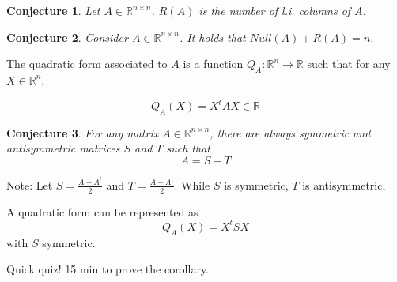 \documentclass[aspectratio=169]{beamer}
\newtheorem{proposition}{Conjecture}[section]
\begin{document}
\begin{frame}
    \begin{proposition}
        Let $A\in\mathds{R}^{n\times n}$. $R(A)$ is the number of l.i. columns of $A$.
    \end{proposition}
    
    \begin{proposition}
        Consider $A\in\mathds{R}^{n\times n}$. It holds that $Null(A)+R(A)=n$.
    \end{proposition}
\end{frame}
\iffalse
\begin{frame}
    \begin{proposition}
        For any $A\in\mathds{R}^{n\times n}$, there is an invertible matrix $C$, and an upper triangular matrix $R$ such that, $$CA=R\Leftrightarrow A=C^{-1}R$$
    \end{proposition}
\end{frame}
\fi
\begin{frame}
    \begin{definition}
        The quadratic form associated to $A$ is a function $Q_A:\mathds{R}^n\rightarrow\mathds{R}$ such that for any $X\in\mathds{R}^n$,
        
        $$Q_A(X)=X^tAX\in\mathds{R}$$
    \end{definition}
\end{frame}

\begin{frame}

\begin{proposition}
    For any matrix $A\in\mathds{R}^{n\times n}$, there are always symmetric and antisymmetric matrices $S$ and $T$ such that $$A=S+T$$
\end{proposition}

Note:  Let $S=\frac{A+A^t}{2}$ and $T=\frac{A-A^t}{2}$. While $S$ is symmetric, $T$ is antisymmetric,
    
    
    \begin{corollary}
        A quadratic form can be represented as $$Q_A(X)=X^t S X$$ with $S$ symmetric.
    \end{corollary}
\end{frame}

\begin{frame}
    Quick quiz! 15 min to prove the corollary.
\end{frame}
\end{document}
